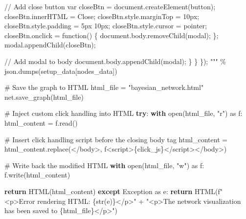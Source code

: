 \documentclass[
  11pt,
  letterpaper,
  openany]{book}
\newenvironment{Shaded}{\begin{snugshade}}{\end{snugshade}}
\newcommand{\BuiltInTok}[1]{\textcolor[rgb]{0.00,0.23,0.31}{#1}}
\newcommand{\CommentTok}[1]{\textcolor[rgb]{0.37,0.37,0.37}{#1}}
\newcommand{\ControlFlowTok}[1]{\textcolor[rgb]{0.00,0.23,0.31}{\textbf{#1}}}
\newcommand{\ImportTok}[1]{\textcolor[rgb]{0.00,0.46,0.62}{#1}}
\newcommand{\NormalTok}[1]{\textcolor[rgb]{0.00,0.23,0.31}{#1}}
\newcommand{\OperatorTok}[1]{\textcolor[rgb]{0.37,0.37,0.37}{#1}}
\newcommand{\PreprocessorTok}[1]{\textcolor[rgb]{0.68,0.00,0.00}{#1}}
\newcommand{\SpecialCharTok}[1]{\textcolor[rgb]{0.37,0.37,0.37}{#1}}
\newcommand{\SpecialStringTok}[1]{\textcolor[rgb]{0.13,0.47,0.30}{#1}}
\newcommand{\StringTok}[1]{\textcolor[rgb]{0.13,0.47,0.30}{#1}}
\begin{document}
\begin{landscape}
\begin{Shaded}
\begin{Highlighting}[]
\StringTok{                // Add close button}
\StringTok{                var closeBtn = document.createElement(\textquotesingle{}button\textquotesingle{});}
\StringTok{                closeBtn.innerHTML = \textquotesingle{}Close\textquotesingle{};}
\StringTok{                closeBtn.style.marginTop = \textquotesingle{}10px\textquotesingle{};}
\StringTok{                closeBtn.style.padding = \textquotesingle{}5px 10px\textquotesingle{};}
\StringTok{                closeBtn.style.cursor = \textquotesingle{}pointer\textquotesingle{};}
\StringTok{                closeBtn.onclick = function() \{}
\StringTok{                    document.body.removeChild(modal);}
\StringTok{                \};}
\StringTok{                modal.appendChild(closeBtn);}

\StringTok{                // Add modal to body}
\StringTok{                document.body.appendChild(modal);}
\StringTok{            \}}
\StringTok{        \}}
\StringTok{    \});}
\StringTok{    """} \OperatorTok{\%}\NormalTok{ json.dumps(setup\_data[}\StringTok{\textquotesingle{}nodes\_data\textquotesingle{}}\NormalTok{])}

    \CommentTok{\# Save the graph to HTML}
\NormalTok{    html\_file }\OperatorTok{=} \StringTok{"bayesian\_network.html"}
\NormalTok{    net.save\_graph(html\_file)}

    \CommentTok{\# Inject custom click handling into HTML}
    \ControlFlowTok{try}\NormalTok{:}
        \ControlFlowTok{with} \BuiltInTok{open}\NormalTok{(html\_file, }\StringTok{"r"}\NormalTok{) }\ImportTok{as}\NormalTok{ f:}
\NormalTok{            html\_content }\OperatorTok{=}\NormalTok{ f.read()}

        \CommentTok{\# Insert click handling script before the closing body tag}
\NormalTok{        html\_content }\OperatorTok{=}\NormalTok{ html\_content.replace(}\StringTok{\textquotesingle{}\textless{}/body\textgreater{}\textquotesingle{}}\NormalTok{, }\SpecialStringTok{f\textquotesingle{}\textless{}script\textgreater{}}\SpecialCharTok{\{}\NormalTok{click\_js}\SpecialCharTok{\}}\SpecialStringTok{\textless{}/script\textgreater{}\textless{}/body\textgreater{}\textquotesingle{}}\NormalTok{)}

        \CommentTok{\# Write back the modified HTML}
        \ControlFlowTok{with} \BuiltInTok{open}\NormalTok{(html\_file, }\StringTok{"w"}\NormalTok{) }\ImportTok{as}\NormalTok{ f:}
\NormalTok{            f.write(html\_content)}

        \ControlFlowTok{return}\NormalTok{ HTML(html\_content)}
    \ControlFlowTok{except} \PreprocessorTok{Exception} \ImportTok{as}\NormalTok{ e:}
        \ControlFlowTok{return}\NormalTok{ HTML(}\SpecialStringTok{f"\textless{}p\textgreater{}Error rendering HTML: }\SpecialCharTok{\{}\BuiltInTok{str}\NormalTok{(e)}\SpecialCharTok{\}}\SpecialStringTok{\textless{}/p\textgreater{}"}
        \OperatorTok{+} \StringTok{"\textless{}p\textgreater{}The network visualization has been saved to \textquotesingle{}}\SpecialCharTok{\{html\_file\}}\StringTok{\textquotesingle{}\textless{}/p\textgreater{}"}\NormalTok{)}
\end{Highlighting}
\end{Shaded}


\end{landscape}
\end{document}
